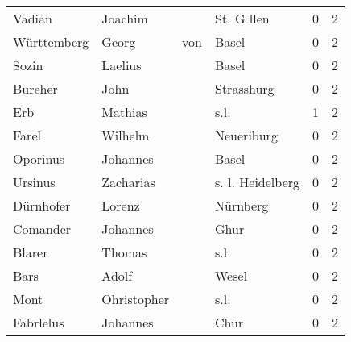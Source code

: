 \begin{tabular}{llllrr}
                   Vadian &                            Joachim &             &                                  St. G llen &          0 &         2 \\
              Württemberg &                              Georg &         von &                                       Basel &          0 &         2 \\
                    Sozin &                            Laelius &             &                                       Basel &          0 &         2 \\
                  Bureher &                               John &             &                                  Strasshurg &          0 &         2 \\
                      Erb &                            Mathias &             &                                        s.l. &          1 &         2 \\
                    Farel &                            Wilhelm &             &                                  Neueriburg &          0 &         2 \\
                 Oporinus &                           Johannes &             &                                       Basel &          0 &         2 \\
                  Ursinus &                          Zacharias &             &                            s. l. Heidelberg &          0 &         2 \\
                Dürnhofer &                             Lorenz &             &                                    Nürnberg &          0 &         2 \\
                 Comander &                           Johannes &             &                                        Ghur &          0 &         2 \\
                   Blarer &                             Thomas &             &                                        s.l. &          0 &         2 \\
                     Bars &                              Adolf &             &                                       Wesel &          0 &         2 \\
                     Mont &                        Ohristopher &             &                                        s.l. &          0 &         2 \\
                Fabrlelus &                           Johannes &             &                                        Chur &          0 &         2 \\

\end{tabular}
